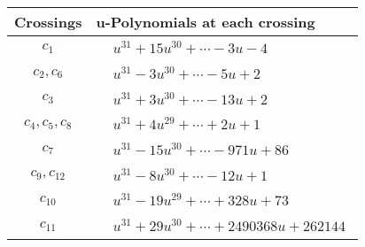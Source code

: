 \documentclass[1p]{elsarticle_modified}
\theoremstyle{definition}
\begin{document}
\begin{tabular}{m{50pt}|m{274pt}}
Crossings & \hspace{64pt}u-Polynomials at each crossing \\
\hline $$\begin{aligned}c_{1}\end{aligned}$$&$\begin{aligned}
&u^{31}+15 u^{30}+\cdots-3 u-4
\end{aligned}$\\
\hline $$\begin{aligned}c_{2},c_{6}\end{aligned}$$&$\begin{aligned}
&u^{31}-3 u^{30}+\cdots-5 u+2
\end{aligned}$\\
\hline $$\begin{aligned}c_{3}\end{aligned}$$&$\begin{aligned}
&u^{31}+3 u^{30}+\cdots-13 u+2
\end{aligned}$\\
\hline $$\begin{aligned}c_{4},c_{5},c_{8}\end{aligned}$$&$\begin{aligned}
&u^{31}+4 u^{29}+\cdots+2 u+1
\end{aligned}$\\
\hline $$\begin{aligned}c_{7}\end{aligned}$$&$\begin{aligned}
&u^{31}-15 u^{30}+\cdots-971 u+86
\end{aligned}$\\
\hline $$\begin{aligned}c_{9},c_{12}\end{aligned}$$&$\begin{aligned}
&u^{31}-8 u^{30}+\cdots-12 u+1
\end{aligned}$\\
\hline $$\begin{aligned}c_{10}\end{aligned}$$&$\begin{aligned}
&u^{31}-19 u^{29}+\cdots+328 u+73
\end{aligned}$\\
\hline $$\begin{aligned}c_{11}\end{aligned}$$&$\begin{aligned}
&u^{31}+29 u^{30}+\cdots+2490368 u+262144
\end{aligned}$\\
\hline
\end{tabular}\\~\\
\end{document}
